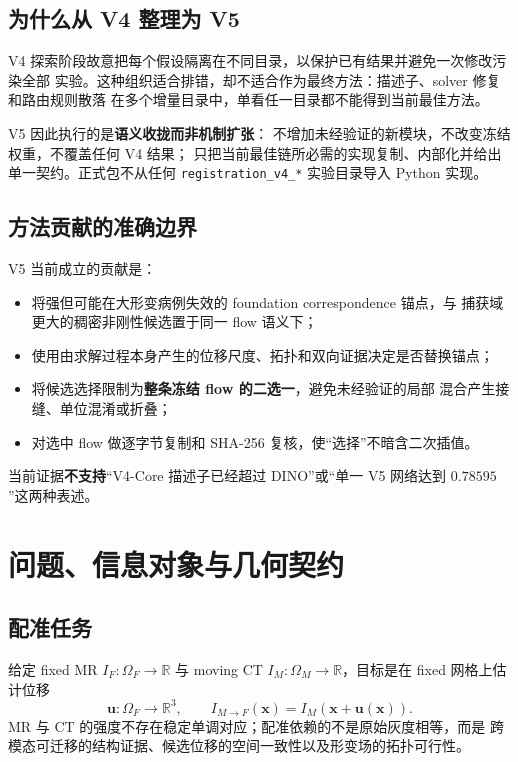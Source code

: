 \documentclass[11pt,a4paper]{ctexart}
\newcommand{\R}{\mathbb{R}}
\begin{document}
\subsection{为什么从 V4 整理为 V5}
V4 探索阶段故意把每个假设隔离在不同目录，以保护已有结果并避免一次修改污染全部
实验。这种组织适合排错，却不适合作为最终方法：描述子、solver 修复和路由规则散落
在多个增量目录中，单看任一目录都不能得到当前最佳方法。

V5 因此执行的是\textbf{语义收拢而非机制扩张}：
不增加未经验证的新模块，不改变冻结权重，不覆盖任何 V4 结果；
只把当前最佳链所必需的实现复制、内部化并给出单一契约。正式包不从任何
\texttt{registration\_v4\_*} 实验目录导入 Python 实现。

\subsection{方法贡献的准确边界}
V5 当前成立的贡献是：
\begin{itemize}
  \item 将强但可能在大形变病例失效的 foundation correspondence 锚点，与
        捕获域更大的稠密非刚性候选置于同一 flow 语义下；
  \item 使用由求解过程本身产生的位移尺度、拓扑和双向证据决定是否替换锚点；
  \item 将候选选择限制为\textbf{整条冻结 flow 的二选一}，避免未经验证的局部
        混合产生接缝、单位混淆或折叠；
  \item 对选中 flow 做逐字节复制和 SHA-256 复核，使“选择”不暗含二次插值。
\end{itemize}
当前证据\textbf{不支持}“V4-Core 描述子已经超过 DINO”或“单一 V5 网络达到
$0.78595$”这两种表述。

\section{问题、信息对象与几何契约}

\subsection{配准任务}
给定 fixed MR $I_F:\Omega_F\to\R$ 与 moving CT
$I_M:\Omega_M\to\R$，目标是在 fixed 网格上估计位移
\[
\mathbf{u}:\Omega_F\rightarrow\R^3,\qquad
I_{M\rightarrow F}(\mathbf{x})
=I_M\!\left(\mathbf{x}+\mathbf{u}(\mathbf{x})\right).
\]
MR 与 CT 的强度不存在稳定单调对应；配准依赖的不是原始灰度相等，而是
跨模态可迁移的结构证据、候选位移的空间一致性以及形变场的拓扑可行性。
\end{document}
